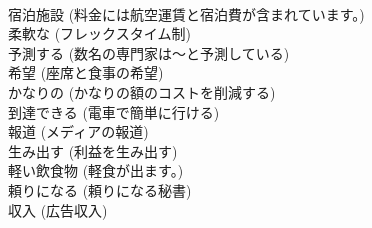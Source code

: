 \documentclass[8pt]{extreport}
\begin{document}
\begin{CJK}{UTF8}{min}
\\	宿泊施設	(料金には航空運賃と宿泊費が含まれています。)		
\\	柔軟な	(フレックスタイム制)		
\\	予測する	(数名の専門家は～と予測している)		
\\	希望	(座席と食事の希望)		
\\	かなりの	(かなりの額のコストを削減する)		
\\	到達できる	(電車で簡単に行ける)		
\\	報道	(メディアの報道)		
\\	生み出す	(利益を生み出す)		
\\	軽い飲食物	(軽食が出ます。)		
\\	頼りになる	(頼りになる秘書)		
\\	収入	(広告収入)		
\end{CJK}
\end{document}
